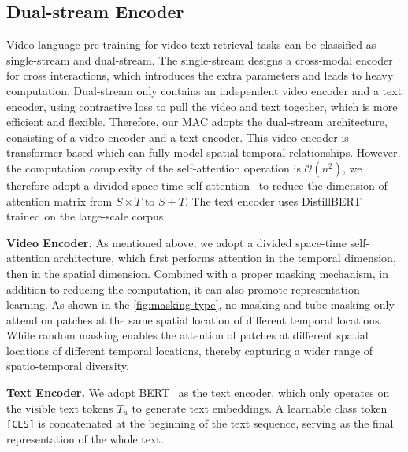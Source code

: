 \documentclass[10pt,twocolumn,letterpaper]{article}
\begin{document}
\vspace{-1mm}\subsection{Dual-stream Encoder}\vspace{-1mm}
\label{sec:dual-stream encoder}
Video-language pre-training for video-text retrieval tasks can be classified as single-stream and dual-stream. The single-stream designs a cross-modal encoder for  cross interactions, which introduces the extra parameters and leads to heavy computation. Dual-stream only contains an independent video encoder and a text encoder, using contrastive loss to pull the video and text together, which is more efficient and flexible. Therefore, our MAC adopts the dual-stream architecture, consisting of a video encoder and a text encoder. This video encoder is transformer-based which can fully model spatial-temporal relationships. However, the computation complexity of the self-attention operation is $\mathcal{O}(n^2)$, we therefore adopt a divided space-time self-attention~\cite{vivit, timesformer} to reduce the dimension of attention matrix from $S \times T$ to $S+T$. The text encoder uses DistillBERT~\cite{distilbert} trained on the large-scale corpus. 

\vspace{1mm}\noindent\textbf{Video Encoder.} As mentioned above, we adopt a divided space-time self-attention architecture, which first performs attention in the temporal dimension, then in the spatial dimension. Combined with a proper masking mechanism, in addition to reducing the computation, it can also promote representation learning. As shown in the \cref{fig:masking-type}, no masking and tube masking only attend on patches at the same spatial location of different temporal locations. While random masking enables the attention of patches at different spatial locations of different temporal locations, thereby capturing a wider range of spatio-temporal diversity. 

\vspace{1mm}\noindent\textbf{Text Encoder.} We adopt BERT~\cite{bert} as the text encoder, which only operates on the visible text tokens $T_u$ to generate text embeddings. A learnable class token \verb+[CLS]+ is concatenated at the beginning of the text sequence, serving as the final representation of the whole text. 
\end{document}
